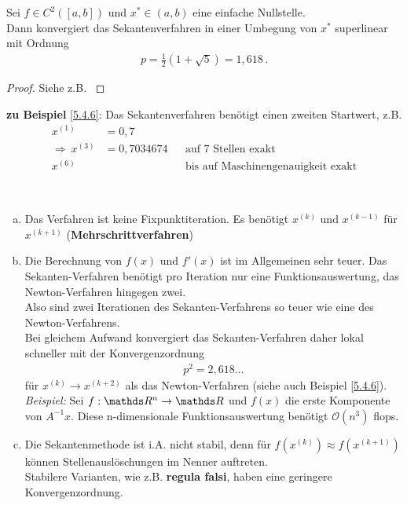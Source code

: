 \begin{Satze}
  Sei $f\in C^2([a,b])$ und $x^{*}\in (a,b)$ eine einfache Nullstelle.\\
  Dann konvergiert das Sekantenverfahren in einer Umbegung von $x^{*}$
  superlinear mit Ordnung 
  \begin{gather*}
    p=\frac{1}{2}(1+\sqrt{5})= 1,618 \, .
  \end{gather*}
\end{Satze}

\begin{proof}
  Siehe z.B. \cite[][Zwischenwertsatz, Fibonacci-Folge]{haemmerlinhoffmann,stoerbulirsch}
\end{proof}

\textbf{zu Beispiel} \ref{5.4.6}: Das Sekantenverfahren benötigt
einen zweiten Startwert, z.B.
\begin{align*}
  x^{(1)}&=0,7 \\
  \Rightarrow ~ x^{(3)} &= 0,7034674 
                        &&\text{auf 7 Stellen exakt}\\
  x^{(6)} &&& \text{bis auf Maschinengenauigkeit exakt}
\end{align*}


\begin{Beme}~
  \begin{enumerate}[a)]
  \item Das Verfahren ist keine Fixpunktiteration.
    Es benötigt $x^{(k)}$ und $x^{(k-1)}$ für $x^{(k+1)}$
    (\textbf{Mehrschrittverfahren})
  \item Die Berechnung von $f(x)$ und $f'(x)$ ist im Allgemeinen
    sehr teuer. Das Sekanten-Verfahren benötigt pro Iteration
    nur eine Funktionsauswertung, das Newton-Verfahren hingegen zwei.\\
    Also sind zwei Iterationen des Sekanten-Verfahrens so teuer wie eine
    des Newton-Verfahrens. \\
    Bei gleichem Aufwand konvergiert das Sekanten-Verfahren daher lokal
    schneller mit der Konvergenzordnung 
    \begin{gather*}
      p^2= 2,618\dotsc
    \end{gather*}
    für $x^{(k)}\rightarrow x^{(k+2)}$ als das Newton-Verfahren
    (siehe auch Beispiel \ref{5.4.6}).\\
    
    \textit{Beispiel:} Sei $f:\R^n\rightarrow\R$ und $f(x)$ die erste Komponente von $ A^{-1}x$.
    Diese n-dimensionale Funktionsauswertung benötigt $\mathcal{O}(n^3)$ flops.
  \item Die Sekantenmethode ist i.A. nicht stabil, denn für $f(x^{(k)})\approx f(x^{(k+1)})$
    können Stellenauslöschungen im Nenner auftreten. \\
    Stabilere Varianten, wie z.B. \textbf{regula falsi}, haben eine geringere Konvergenzordnung.
  \end{enumerate}
\end{Beme}



